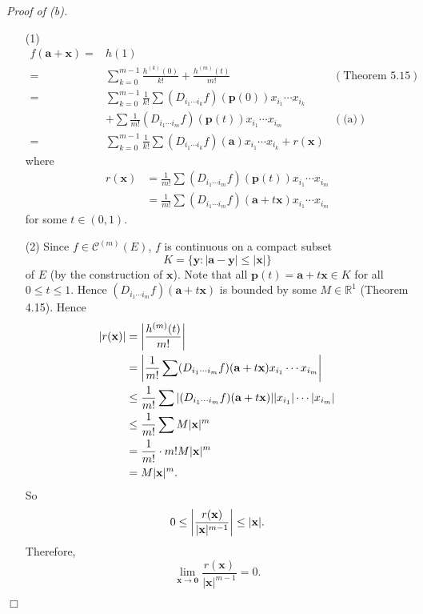 \documentclass{article}
\begin{document}
\emph{Proof of (b).}
\begin{enumerate}
\item[(1)]
  \begin{align*}
    f(\mathbf{a}+\mathbf{x})
    =& h(1) \\
    =& \sum_{k=0}^{m-1} \frac{h^{(k)}(0)}{k!} + \frac{h^{(m)}(t)}{m!}
      &(\text{Theorem 5.15}) \\
    =& \sum_{k=0}^{m-1}
       \frac{1}{k!}
         \sum (D_{i_1 \cdots i_k}f)(\mathbf{p}(0)) x_{i_1} \cdots x_{i_k} \\
        &+ \sum \frac{1}{m!}(D_{i_1 \cdots i_m}f)(\mathbf{p}(t)) x_{i_1} \cdots x_{i_m}
      &(\text{(a)}) \\
    =& \sum_{k=0}^{m-1}
       \frac{1}{k!}
         \sum (D_{i_1 \cdots i_k}f)(\mathbf{a}) x_{i_1} \cdots x_{i_k}
       + r(\mathbf{x})
  \end{align*}
  where
  \begin{align*}
    r(\mathbf{x})
    &= \frac{1}{m!} \sum (D_{i_1 \cdots i_m}f)(\mathbf{p}(t)) x_{i_1} \cdots x_{i_m} \\
    &= \frac{1}{m!} \sum (D_{i_1 \cdots i_m}f)(\mathbf{a}+t\mathbf{x}) x_{i_1} \cdots x_{i_m}
  \end{align*}
  for some $t \in (0,1)$.

\item[(2)]
  Since $f \in \mathscr{C}^{(m)}(E)$,
  $f$ is continuous on a compact subset
  \[
    K = \{ \mathbf{y} : |\mathbf{a} - \mathbf{y}| \leq |\mathbf{x}| \}
  \]
  of $E$ (by the construction of $\mathbf{x}$).
  Note that all $\mathbf{p}(t) = \mathbf{a} + t \mathbf{x} \in K$ for all $0 \leq t \leq 1$.
  Hence
  $(D_{i_1 \cdots i_m}f)(\mathbf{a}+t\mathbf{x})$ is bounded by some $M \in \mathbb{R}^1$
  (Theorem 4.15).
  Hence
  \begin{align*}
    \abs{ r(\mathbf{x}) }
    &= \abs{ \frac{h^{(m)}(t)}{m!} } \\
    &= \abs{ \frac{1}{m!}
      \sum (D_{i_1 \cdots i_m}f)(\mathbf{a}+t\mathbf{x}) x_{i_1} \cdots x_{i_m} } \\
    &\leq \frac{1}{m!} \sum \abs{ (D_{i_1 \cdots i_m}f)(\mathbf{a}+t\mathbf{x}) }
      \abs{ x_{i_1} } \cdots \abs{ x_{i_m} } \\
    &\leq \frac{1}{m!} \sum M |\mathbf{x}|^m \\
    &= \frac{1}{m!} \cdot m! M |\mathbf{x}|^m \\
    &= M |\mathbf{x}|^m .
  \end{align*}
  So
  \[
    0 \leq \abs{ \frac{r(\mathbf{x})}{|\mathbf{x}|^{m-1}} }
    \leq |\mathbf{x}|.
  \]
  Therefore,
  \[
    \lim_{\mathbf{x} \to \mathbf{0}} \frac{r(\mathbf{x})}{|\mathbf{x}|^{m-1}} = 0.
  \]
\end{enumerate}
$\Box$ \\
\end{document}
